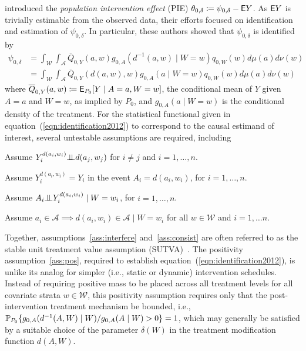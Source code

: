 \citet{diaz2012population} introduced the \textit{population intervention
effect} (PIE) $\theta_{0, \delta} \coloneqq \psi_{0, \delta} - \mathsf{E} Y$. As $\mathsf{E} Y$
is trivially estimable from the observed data, their efforts focused on
identification and estimation of $\psi_{0,\delta}$. In particular, these authors
showed that $\psi_{0, \delta}$ is identified by
\begin{align}\label{eqn:identification2012}
  \psi_{0,\delta} &= \int_{\mathcal{W}} \int_{\mathcal{A}}
  \overline{Q}_{0,Y}(a, w) g_{0, A}(d^{-1}(a, w) \mid W = w)
  q_{0, W}(w) d\mu(a)d\nu(w) \nonumber \\
  &= \int_{\mathcal{W}} \int_{\mathcal{A}}
  \overline{Q}_{0,Y}(d(a, w), w) g_{0, A}(a \mid W = w)
  q_{0, W}(w) d\mu(a)d\nu(w)
\end{align}
where $\overline{Q}_{0,Y}(a,w) \coloneqq \mathsf{E}_{P_0}[Y \mid A = a, W = w]$, the
conditional mean of $Y$ given $A = a$ and $W = w$, as implied by $P_0$, and
$g_{0,A}(a \mid W = w)$ is the conditional density of the treatment. For the
statistical functional given in equation~(\ref{eqn:identification2012}) to
correspond to the causal estimand of interest, several untestable assumptions
are required, including
\begin{assumptioniden}
  Assume $Y^{d(a_i, w_i)}_i \mbox{$\perp\!\!\!\perp$} d(a_j, w_j)$ for $i \neq j$ and
  $i = 1, \ldots, n$.
  \label{ass:interfere}
\end{assumptioniden}
\begin{assumptioniden}[Consistency]
  Assume $Y^{d(a_i, w_i)}_i = Y_i$ in the event $A_i = d(a_i, w_i)$, for
  $i = 1, \ldots, n$.
  \label{ass:consist}
\end{assumptioniden}
\begin{assumptioniden}
  Assume $A_i \mbox{$\perp\!\!\!\perp$} Y^{d(a_i, w_i)}_i \mid W = w_i$, for $i = 1, \ldots, n$.
  \label{ass:nuc}
\end{assumptioniden}
\begin{assumptioniden}[Positivity]
  Assume $a_i \in \mathcal{A} \implies d(a_i, w_i) \in \mathcal{A} \mid
  W = w_i$ for all $w \in \mathcal{W}$ and $i = 1, \ldots n$.
  \label{ass:pos}
\end{assumptioniden}
Together, assumptions~\ref{ass:interfere} and~\ref{ass:consist} are often
referred to as the stable unit treatment value assumption
(SUTVA)~\citep{rubin1978bayesian,rubin1980randomization}. The positivity
assumption~\ref{ass:pos}, required to establish
equation~(\ref{eqn:identification2012}), is unlike its analog for simpler (i.e.,
static or dynamic) intervention schedules. Instead of requiring positive mass to
be placed across all treatment levels for all covariate strata $w \in
\mathcal{W}$, this positivity assumption requires only that the
post-intervention treatment mechanism be bounded, i.e., $\mathbb{P}_{P_0}
\{g_{0,A}(d^{-1}(A, W) \mid W) / g_{0,A}(A \mid W) > 0 \} = 1$, which may
generally be satisfied by a suitable choice of the parameter $\delta(W)$ in the
treatment modification function $d(A,W)$.

